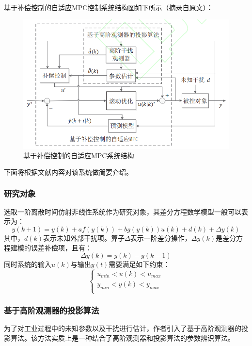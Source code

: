 \documentclass[UTF8, 12pt]{article}
\begin{document}
基于补偿控制的自适应MPC控制系统结构图如下所示（摘录自原文）：
\begin{figure}[H]
    \centering %
    \includegraphics[width=.8\textwidth]{figure/基于补偿控制的自适应MPC系统结构.png} 
    \caption{基于补偿控制的自适应MPC系统结构} %
\end{figure}
下面将根据文献内容对该系统做简要介绍。

\subsubsection{研究对象}
选取一阶离散时间仿射非线性系统作为研究对象，其差分方程数学模型一般可以表示为：
\begin{equation*}
	y(k+1) = y(k) + af(y(k)) + bg(y(k))u(k) + d(k) + \Delta y(k)
\end{equation*}
其中，$d(k)$表示未知外部干扰项。算子$\Delta$表示一阶差分操作，$\Delta y(k)$是差分方程建模的误差补偿项，且有：
\begin{equation*}
	\Delta y(k) = y(k) - y(k-1)
\end{equation*}
同时系统的输入$u(k)$与输出$y(t)$需要满足如下约束：
\begin{equation*}
	\begin{cases}
		u_{min} < u(k) < u_{max} \\
		y_{min} < y(k) < y_{max} \\
	\end{cases}
\end{equation*}

\subsubsection{基于高阶观测器的投影算法}
为了对工业过程中的未知参数以及干扰进行估计，作者引入了基于高阶观测器的投影算法。该方法实质上是一种结合了高阶观测器和投影算法的参数辨识算法。
\end{document}
